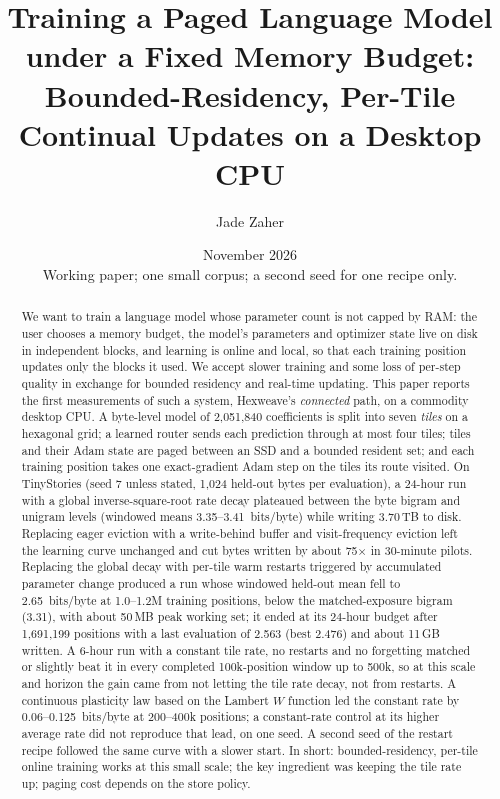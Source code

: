 \documentclass[10pt]{article}
\title{Training a Paged Language Model under a Fixed Memory Budget:\\
Bounded-Residency, Per-Tile Continual Updates on a Desktop CPU}
\author{Jade Zaher}
\date{November 2026 \\ {\small Working paper; one small corpus; a second seed for one recipe only.}}
\newcommand{\bpb}{bits/byte}
\begin{document}
\maketitle

\begin{abstract}
We want to train a language model whose parameter count is not capped by RAM: the user chooses a
memory budget, the model's parameters and optimizer state live on disk in independent blocks, and
learning is online and local, so that each training position updates only the blocks it used. We
accept slower training and some loss of per-step quality in exchange for bounded residency and
real-time updating. This paper reports the first measurements of such a system, Hexweave's
\emph{connected} path, on a commodity desktop CPU. A byte-level model of 2,051,840 coefficients is
split into seven \emph{tiles} on a hexagonal grid; a learned router sends each prediction through at
most four tiles; tiles and their Adam state are paged between an SSD and a bounded resident set; and
each training position takes one exact-gradient Adam step on the tiles its route visited. On
TinyStories (seed 7 unless stated, 1,024 held-out bytes per evaluation), a 24-hour run with a global
inverse-square-root rate decay plateaued between the byte bigram and unigram levels (windowed means
3.35--3.41~\bpb) while writing 3.70\,TB to disk. Replacing eager eviction with a write-behind buffer
and visit-frequency eviction left the learning curve unchanged and cut bytes written by about 75$\times$
in 30-minute pilots. Replacing the global decay with per-tile warm restarts triggered by accumulated
parameter change produced a run whose windowed held-out mean fell to 2.65~\bpb{} at 1.0--1.2M training
positions, below the matched-exposure bigram (3.31), with about 50\,MB peak working set; it ended at
its 24-hour budget after 1,691,199 positions with a last evaluation of 2.563 (best 2.476) and about
11\,GB written. A 6-hour run with a constant tile rate, no restarts and no forgetting matched or
slightly beat it in every completed 100k-position window up to 500k, so at this scale and horizon the
gain came from not letting the tile rate decay, not from restarts. A continuous plasticity law based
on the Lambert $W$ function led the constant rate by 0.06--0.125~\bpb{} at 200--400k positions; a
constant-rate control at its higher average rate did not reproduce that lead, on one seed. A second seed of the restart recipe
followed the same curve with a slower start. In short: bounded-residency, per-tile online training
works at this small scale; the key ingredient was keeping the tile rate up; paging cost depends on
the store policy.
\end{abstract}
\end{document}
